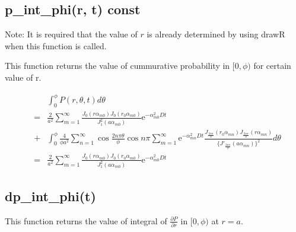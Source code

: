 \documentclass{article}
\begin{document}
\subsection{p\_int\_phi(r, t) const}

Note: It is required that the value of $r$ is already determined by using drawR when this function is called.

This function returns the value of cummurative probability in $[0,\phi)$ for certain value of r.

\begin{eqnarray}
    & & \int^{\phi}_0 P(r, \theta, t) d\theta \nonumber\\
    &=& \frac{2}{a^2} \sum^{\infty}_{m=1}
        \frac{J_0(r\alpha_{m0}) J_0(r_0\alpha_{m0})}
             {J^2_1(a\alpha_{m0})}
        \mathrm{e}^{-\alpha^2_{m0}Dt} \nonumber \\
    &+& \int^{\phi}_0
        \frac{4}{\phi a^2}\sum^{\infty}_{n=1}
        \cos\frac{2n\pi\theta}{\phi}\cos n\pi
        \sum^{\infty}_{m=1}
        \mathrm{e}^{-\alpha_{mn}^2Dt}
        \frac{J_{\frac{2n\pi}{\phi}}(r_0\alpha_{mn})
              J_{\frac{2n\pi}{\phi}}(r\alpha_{mn})}
             {\{J'_{\frac{2n\pi}{\phi}}(a\alpha_{mn})\}^2}
        d\theta \nonumber \\
    &=& \frac{2}{a^2} \sum^{\infty}_{m=1}
        \frac{J_0(r\alpha_{m0}) J_0(r_0\alpha_{m0})}{J^2_1(a\alpha_{m0})}
        \mathrm{e}^{-\alpha^2_{m0}Dt} \nonumber
\end{eqnarray}

\subsection{dp\_int\_phi(t)}

This function returns the value of integral of $\frac{\partial P}{\partial r}$ in $[0,\phi)$ at $r = a$.
\end{document}
